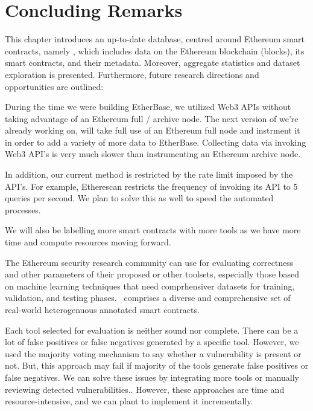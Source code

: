 \section{Concluding Remarks}
	This chapter introduces an up-to-date database, centred around Ethereum smart contracts, namely \etherbase, which includes data on the Ethereum blockchain (blocks), its smart contracts, and their metadata.
	Moreover, aggregate statistics and dataset exploration is presented.
	Furthermore, future research directions and opportunities are outlined:

	During the time we were building EtherBase, we utilized Web3 APIs without taking advantage of an Ethereum full / archive node.
	The next version of \etherbase we're already working on, will take full use of an Ethereum full node and instrment it in order to add a variety of more data to EtherBase.
	Collecting data via invoking Web3 API's is very much slower than instrumenting an Ethereum archive node.
	
	In addition, our current method is restricted by the rate limit imposed by the API's.
	For example, Etherescan restricts the frequency of invoking its API to 5 queries per second. We plan to solve this as well to speed the automated processes.

	We will also be labelling more smart contracts with more tools as we have more time and compute resources moving forward.

	The Ethereum security research community can use \etherbase for evaluating correctness and other parameters of their proposed or other toolsets, especially those based on machine learning techniques that need comprhensiver datasets for training, validation, and testing phases.
	\etherbase~comprises a diverse and comprehensive set of real-world heterogenuous annotated smart contracts.
	
	
	Each tool selected for evaluation is neither sound nor complete. There can be a lot of false positives or false negatives generated by a specific tool.
	However, we used the majority voting mechanism to say whether a vulnerability is present or not.
	But, this approach may fail if majority of the tools generate false positives or false negatives.
	We can solve these issues by integrating more tools or manually reviewing detected vulnerabilities..
	However, these approaches are time and resource-intensive, and we can plant to implement it incrementally.